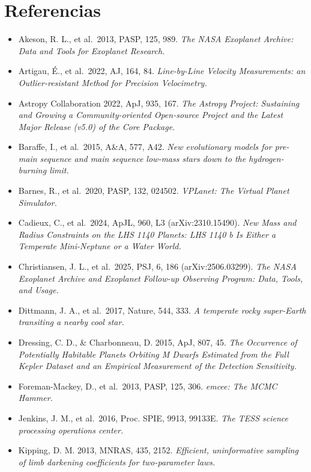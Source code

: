 \documentclass[twocolumn,aps,pra,11pt]{revtex4-2}
\begin{document}
\section*{Referencias}
\begin{itemize}[leftmargin=1.2em,itemsep=1pt,label={}]
  \footnotesize
  \item Akeson, R. L., et al.\ 2013, PASP, 125, 989. \emph{The NASA Exoplanet Archive: Data and Tools for Exoplanet Research.}
  \item Artigau, \'E., et al.\ 2022, AJ, 164, 84. \emph{Line-by-Line Velocity Measurements: an Outlier-resistant Method for Precision Velocimetry.}
  \item Astropy Collaboration 2022, ApJ, 935, 167. \emph{The Astropy Project: Sustaining and Growing a Community-oriented Open-source Project and the Latest Major Release (v5.0) of the Core Package.}
  \item Baraffe, I., et al.\ 2015, A\&A, 577, A42. \emph{New evolutionary models for pre-main sequence and main sequence low-mass stars down to the hydrogen-burning limit.}
  \item Barnes, R., et al.\ 2020, PASP, 132, 024502. \emph{VPLanet: The Virtual Planet Simulator.}
  \item Cadieux, C., et al.\ 2024, ApJL, 960, L3 (arXiv:2310.15490). \emph{New Mass and Radius Constraints on the LHS 1140 Planets: LHS 1140 b Is Either a Temperate Mini-Neptune or a Water World.}
  \item Christiansen, J. L., et al.\ 2025, PSJ, 6, 186 (arXiv:2506.03299). \emph{The NASA Exoplanet Archive and Exoplanet Follow-up Observing Program: Data, Tools, and Usage.}
  \item Dittmann, J. A., et al.\ 2017, Nature, 544, 333. \emph{A temperate rocky super-Earth transiting a nearby cool star.}
  \item Dressing, C. D., \& Charbonneau, D. 2015, ApJ, 807, 45. \emph{The Occurrence of Potentially Habitable Planets Orbiting M Dwarfs Estimated from the Full Kepler Dataset and an Empirical Measurement of the Detection Sensitivity.}
  \item Foreman-Mackey, D., et al.\ 2013, PASP, 125, 306. \emph{emcee: The MCMC Hammer.}
  \item Jenkins, J. M., et al.\ 2016, Proc. SPIE, 9913, 99133E. \emph{The TESS science processing operations center.}
  \item Kipping, D. M. 2013, MNRAS, 435, 2152. \emph{Efficient, uninformative sampling of limb darkening coefficients for two-parameter laws.}

\end{itemize}
\end{document}
